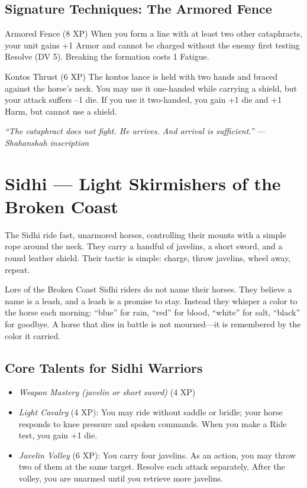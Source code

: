 \documentclass[9pt,a5paper]{extbook}
\begin{document}
\subsection{Signature Techniques: The Armored Fence}

\begin{talentbox}{Armored Fence (8 XP)}
When you form a line with at least two other cataphracts, your unit gains +1 Armor and cannot be charged without the enemy first testing Resolve (DV 5). Breaking the formation costs 1 Fatigue.
\end{talentbox}

\begin{talentbox}{Kontos Thrust (6 XP)}
The kontos lance is held with two hands and braced against the horse's neck. You may use it one-handed while carrying a shield, but your attack suffers --1 die. If you use it two-handed, you gain +1 die and +1 Harm, but cannot use a shield.
\end{talentbox}

\vspace{0.2cm}
\noindent\textit{``The cataphract does not fight. He arrives. And arrival is sufficient.''}  
\hfill --- \textit{Shahanshah inscription}

\clearpage

\section{Sidhi --- Light Skirmishers of the Broken Coast}

The Sidhi ride fast, unarmored horses, controlling their mounts with a simple rope around the neck. They carry a handful of javelins, a short sword, and a round leather shield. Their tactic is simple: charge, throw javelins, wheel away, repeat.

\begin{warriorbox}{Lore of the Broken Coast}
Sidhi riders do not name their horses. They believe a name is a leash, and a leash is a promise to stay. Instead they whisper a color to the horse each morning: ``blue'' for rain, ``red'' for blood, ``white'' for salt, ``black'' for goodbye. A horse that dies in battle is not mourned---it is remembered by the color it carried.
\end{warriorbox}

\subsection{Core Talents for Sidhi Warriors}
\begin{itemize}
    \item \textit{Weapon Mastery (javelin or short sword)} (4 XP)
    \item \textit{Light Cavalry} (4 XP): You may ride without saddle or bridle; your horse responds to knee pressure and spoken commands. When you make a Ride test, you gain +1 die.
    \item \textit{Javelin Volley} (6 XP): You carry four javelins. As an action, you may throw two of them at the same target. Resolve each attack separately. After the volley, you are unarmed until you retrieve more javelins.
\end{itemize}
\end{document}
